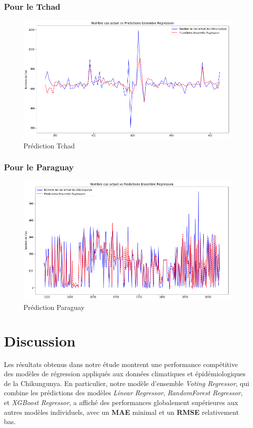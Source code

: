 \subsubsection{Pour le Tchad}
\begin{figure}[h!]
	\centering
	\includegraphics[width=0.9\linewidth]{images/prediction_chad}
	\caption{Prédiction Tchad}
	\label{fig:predictionchad}
\end{figure}
\subsubsection{Pour le Paraguay}
\begin{figure}[h!]
	\centering
	\includegraphics[width=0.9\linewidth]{images/prediction_paraguay}
	\caption{Prédiction Paraguay}
	\label{fig:predictionparaguay}
\end{figure}
\newpage
\section{Discussion}

Les résultats obtenus dans notre étude montrent une performance compétitive des modèles de régression appliqués aux données climatiques et épidémiologiques de la Chikungunya. En particulier, notre modèle d'ensemble \textit{Voting Regressor}, qui combine les prédictions des modèles \textit{Linear Regressor}, \textit{RandomForest Regressor}, et \textit{XGBoost Regressor}, a affiché des performances globalement supérieures aux autres modèles individuels, avec un \textbf{MAE} minimal et un \textbf{RMSE} relativement bas.


